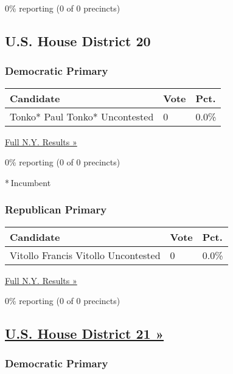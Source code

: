 0\% reporting (0 of 0 precincts)

\hypertarget{us-house-district-20}{%
\subsection{U.S. House District 20}\label{us-house-district-20}}

\hypertarget{democratic-primary-20}{%
\subsubsection{Democratic Primary}\label{democratic-primary-20}}

\begin{longtable}[]{@{}lll@{}}
\toprule
Candidate & Vote & Pct.\tabularnewline
\midrule
\endhead
 Tonko* Paul Tonko* Uncontested & 0 & 0.0\%\tabularnewline
\bottomrule
\end{longtable}

\href{https://www.nytimes3xbfgragh.onion/elections/results/new-york}{Full
N.Y. Results »}

0\% reporting (0 of 0 precincts)

* Incumbent

\hypertarget{republican-primary-14}{%
\subsubsection{Republican Primary}\label{republican-primary-14}}

\begin{longtable}[]{@{}lll@{}}
\toprule
Candidate & Vote & Pct.\tabularnewline
\midrule
\endhead
 Vitollo Francis Vitollo Uncontested & 0 & 0.0\%\tabularnewline
\bottomrule
\end{longtable}

\href{https://www.nytimes3xbfgragh.onion/elections/results/new-york}{Full
N.Y. Results »}

0\% reporting (0 of 0 precincts)

\hypertarget{us-house-district-21-}{%
\subsection{\texorpdfstring{\href{https://www.nytimes3xbfgragh.onion/elections/results/new-york-house-district-21-primary-election}{U.S.
House District 21
»}}{U.S. House District 21 »}}\label{us-house-district-21-}}

\hypertarget{democratic-primary-21}{%
\subsubsection{Democratic Primary}\label{democratic-primary-21}}

